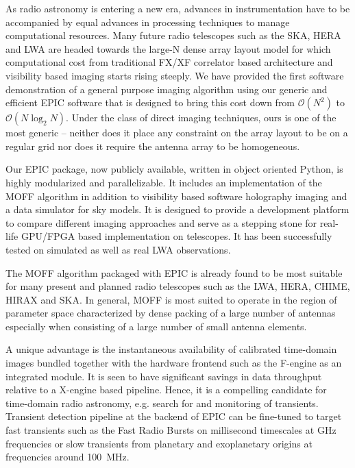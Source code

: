 \documentclass[a4paper,fleqn,usenatbib]{mnras}
\begin{document}
As radio astronomy is entering a new era, advances in instrumentation have to
be accompanied by equal advances in processing techniques to manage 
computational resources. Many future radio telescopes such as the SKA, HERA and 
LWA are headed towards the large-N dense array layout model for which 
computational cost from traditional FX/XF correlator based architecture and 
visibility based imaging starts rising steeply. We have provided the first 
software demonstration of a general purpose imaging algorithm using our generic 
and efficient EPIC software that is designed to bring this cost down from 
$\mathcal{O}(N^2)$ to $\mathcal{O}(N\log_2 N)$. Under the class of direct imaging 
techniques, ours is one of the most generic -- neither does it place any 
constraint on the array layout to be on a regular grid nor does it require the
antenna array to be homogeneous. 

Our EPIC package, now publicly available, written in object oriented Python, is 
highly modularized and parallelizable. It includes an implementation of the 
MOFF algorithm in addition to visibility based software holography imaging and 
a data simulator for sky models. It is designed to provide a development 
platform to compare different imaging approaches and serve as a stepping stone 
for real-life GPU/FPGA based implementation on telescopes. It has been 
successfully tested on simulated as well as real LWA observations. 

The MOFF algorithm packaged with EPIC is already found to be most suitable 
for many present and planned radio telescopes such as the LWA, HERA, CHIME,
HIRAX and SKA. In general, MOFF is most suited to operate in the region of 
parameter space characterized by dense packing of a large number of antennas 
especially when consisting of a large number of small antenna elements. 

A unique advantage is the instantaneous availability of calibrated time-domain 
images bundled together with the hardware frontend such as the F-engine as an 
integrated module. It is seen to have significant savings in data throughput 
relative to a X-engine based pipeline. Hence, it is a compelling candidate for 
time-domain radio astronomy, e.g. search for and monitoring of transients. 
Transient detection pipeline at the backend of EPIC can be fine-tuned to target 
fast transients such as the Fast Radio Bursts \citep[FRB;][]{tho13} on 
millisecond timescales at GHz frequencies or slow transients from planetary and 
exoplanetary origins at frequencies around 100~MHz. 
\end{document}
